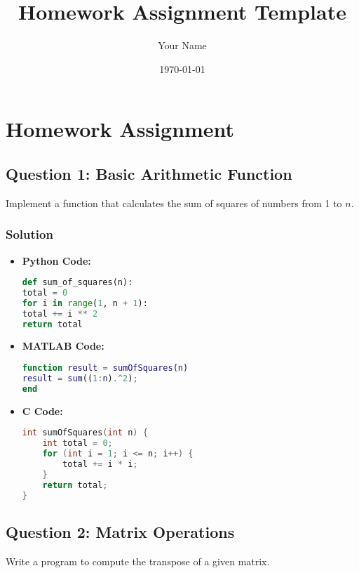 \documentclass[11pt, a4paper]{article}
\title{Homework Assignment Template}
\author{Your Name}
\date{\today}
\begin{document}
	
	\maketitle
	
	\section*{Homework Assignment}
	
	\subsection*{Question 1: Basic Arithmetic Function}
	Implement a function that calculates the sum of squares of numbers from 1 to $n$.
	
	\subsubsection*{Solution}
	\begin{itemize}
		\item \textbf{Python Code:}
		\begin{lstlisting}[language=Python]
def sum_of_squares(n):
total = 0
for i in range(1, n + 1):
total += i ** 2
return total
		\end{lstlisting}
		\item \textbf{MATLAB Code:}
		\begin{lstlisting}[language=MATLAB]
function result = sumOfSquares(n)
result = sum((1:n).^2);
end
		\end{lstlisting}
		\item \textbf{C Code:}
		\begin{lstlisting}[language=C]
int sumOfSquares(int n) {
	int total = 0;
	for (int i = 1; i <= n; i++) {
		total += i * i;
	}
	return total;
}
		\end{lstlisting}
	\end{itemize}
	
	\subsection*{Question 2: Matrix Operations}
	Write a program to compute the transpose of a given matrix.
	
\end{document}
